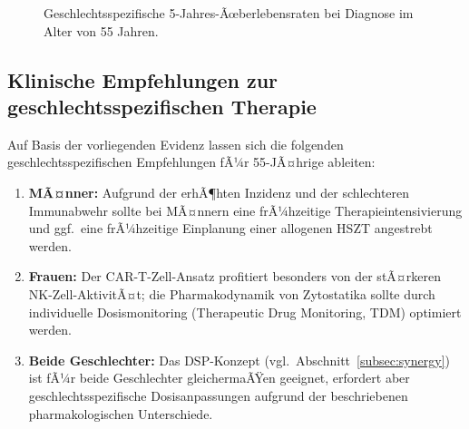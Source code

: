 ﻿\documentclass[12pt,a4paper]{article}
\theoremstyle{definition}
\begin{document}
\begin{figure}[ht]
\centering
{}
\caption{Geschlechtsspezifische 5-Jahres-Ãœberlebensraten bei Diagnose im Alter von 55 Jahren.}
\label{fig:gender_bar}
\end{figure}

\subsection{Klinische Empfehlungen zur geschlechtsspezifischen Therapie}

Auf Basis der vorliegenden Evidenz lassen sich die folgenden geschlechtsspezifischen
Empfehlungen fÃ¼r 55-JÃ¤hrige ableiten:

\begin{enumerate}
  \item \textbf{MÃ¤nner:} Aufgrund der erhÃ¶hten Inzidenz und der schlechteren
        Immunabwehr sollte bei MÃ¤nnern eine frÃ¼hzeitige Therapieintensivierung und
        ggf.\ eine frÃ¼hzeitige Einplanung einer allogenen HSZT angestrebt werden.
  \item \textbf{Frauen:} Der CAR-T-Zell-Ansatz profitiert besonders von der
        stÃ¤rkeren NK-Zell-AktivitÃ¤t; die Pharmakodynamik von Zytostatika sollte
        durch individuelle Dosismonitoring (Therapeutic Drug Monitoring, TDM)
        optimiert werden.
  \item \textbf{Beide Geschlechter:} Das DSP-Konzept (vgl.\
        Abschnitt~\ref{subsec:synergy}) ist fÃ¼r beide Geschlechter gleichermaÃŸen
        geeignet, erfordert aber geschlechtsspezifische Dosisanpassungen aufgrund
        der beschriebenen pharmakologischen Unterschiede.
\end{enumerate}
\end{document}

